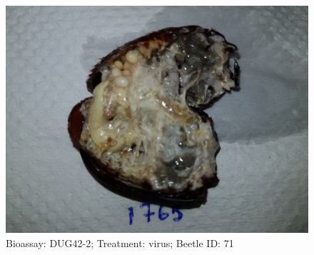 \documentclass[11pt]{scrartcl}
\begin{document}
\begin{figure}[h!]
    \centering
    \includegraphics[width=\linewidth, height=\textheight, keepaspectratio]{uploads/btl.pm_image.a72e78cfb1716c7b.447567343220313736355f5265702d322076697275732e6a7067.jpg}
    \caption{Bioassay: DUG42-2; Treatment: virus; Beetle ID: 71}
\end{figure}
\clearpage
\end{document}
